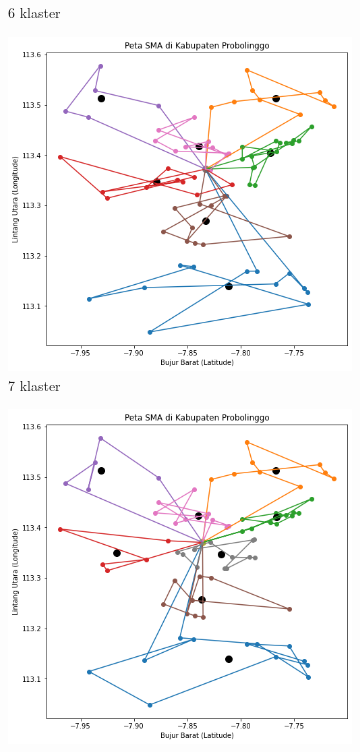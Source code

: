 \begin{figure}[H]
\begin{subfigure}[b]{0.3\textwidth}
		\caption{6 klaster}	
		\label{fig:klasterbeda6}
	\end{subfigure}
	\hfill
	\begin{subfigure}[b]{0.3\textwidth}
		\includegraphics[width=\textwidth]{Gambar/hasil_mtsp/7.png}
		\caption{7 klaster}	
		\label{fig:klasterbeda7}
	\end{subfigure}
	\hfill
	\begin{subfigure}[b]{0.3\textwidth}
		\includegraphics[width=\textwidth]{Gambar/hasil_mtsp/8.png}

\end{subfigure}
\end{figure}
